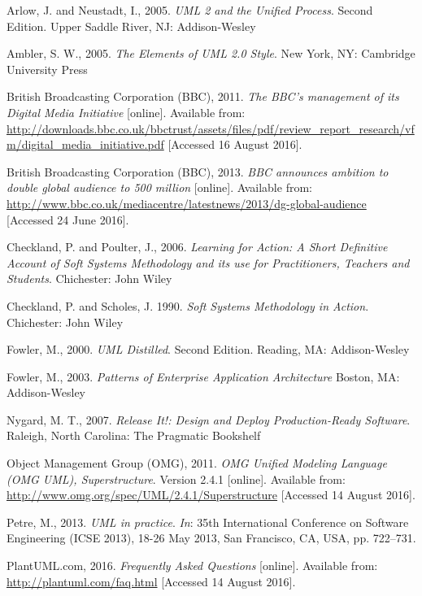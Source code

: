 \documentclass{article}
\begin{document}
\begin{thebibliography}{9}

Arlow, J. and Neustadt, I., 2005.
\textit{UML 2 and the Unified Process}. Second Edition.
Upper Saddle River, NJ: Addison-Wesley

Ambler, S. W., 2005.
\textit{The Elements of UML 2.0 Style}.
New York, NY: Cambridge University Press

British Broadcasting Corporation (BBC), 2011.
\textit{The BBC's management of its Digital Media Initiative} [online].
Available from: \url{http://downloads.bbc.co.uk/bbctrust/assets/files/pdf/review_report_research/vfm/digital_media_initiative.pdf} [Accessed 16 August 2016].

British Broadcasting Corporation (BBC), 2013.
\textit{BBC announces ambition to double global audience to 500 million} [online].
Available from: \url{http://www.bbc.co.uk/mediacentre/latestnews/2013/dg-global-audience} [Accessed 24 June 2016].

Checkland, P. and Poulter, J., 2006.
\textit{Learning for Action: A Short Definitive Account of Soft Systems Methodology and its use for Practitioners, Teachers and Students}.
Chichester: John Wiley

Checkland, P. and Scholes, J. 1990.
\textit{Soft Systems Methodology in Action}.
Chichester: John Wiley

Fowler, M., 2000.
\textit{UML Distilled}. Second Edition.
Reading, MA: Addison-Wesley

Fowler, M., 2003.
\textit{Patterns of Enterprise Application Architecture}
Boston, MA: Addison-Wesley

Nygard, M. T., 2007.
\textit{Release It!: Design and Deploy Production-Ready Software}.
Raleigh, North Carolina: The Pragmatic Bookshelf

Object Management Group (OMG), 2011.
\textit{OMG Unified Modeling Language (OMG UML), Superstructure}. Version 2.4.1 [online].
Available from: \url{http://www.omg.org/spec/UML/2.4.1/Superstructure} [Accessed 14 August 2016].

Petre, M., 2013.
\textit{UML in practice}. \textit{In}: 35th International Conference on Software Engineering (ICSE 2013), 18-26 May 2013, San Francisco, CA, USA, pp. 722–731.

PlantUML.com, 2016.
\textit{Frequently Asked Questions} [online].
Available from: \url{http://plantuml.com/faq.html} [Accessed 14 August 2016].


\end{thebibliography}
\end{document}
